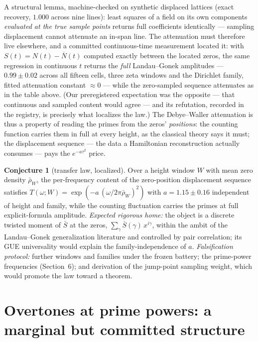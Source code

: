 \documentclass[11pt]{article}
\theoremstyle{definition}
\newtheorem{conjecture}{Conjecture}
\theoremstyle{remark}
\newcommand{\Nbar}{\overline{N}}
\begin{document}
A structural lemma, machine-checked on synthetic displaced lattices (exact recovery, $1.000$
across nine lines): least squares of a field on its own components \emph{evaluated at the true
sample points} returns full coefficients identically --- sampling displacement cannot attenuate an
in-span line. The attenuation must therefore live elsewhere, and a committed continuous-time
measurement located it: with $S(t) = N(t) - \Nbar(t)$ computed exactly between the located zeros,
the same regression in continuous $t$ returns the \emph{full} Landau--Gonek amplitudes ---
$0.99 \pm 0.02$ across all fifteen cells, three zeta windows and the Dirichlet family, fitted
attenuation constant $\approx 0$ --- while the zero-sampled sequence attenuates as in the table
above. (Our preregistered expectation was the opposite --- that continuous and sampled content
would agree --- and its refutation, recorded in the registry, is precisely what localizes the
law.) The Debye--Waller attenuation is thus a property of reading the primes from the zeros'
\emph{positions}: the counting function carries them in full at every height, as the classical
theory says it must; the displacement sequence --- the data a Hamiltonian reconstruction actually
consumes --- pays the $e^{-a\tau^2}$ price.

\begin{conjecture}[transfer law, localized]
Over a height window $W$ with mean zero density $\bar\rho_W$, the per-frequency content of the
zero-position displacement sequence satisfies
$T(\omega; W) = \exp(-a\,(\omega/2\pi\bar\rho_W)^2)$ with $a = 1.15 \pm 0.16$ independent of
height and family, while the counting fluctuation carries the primes at full explicit-formula
amplitude. \emph{Expected rigorous home:} the object is a discrete twisted moment of $\bar S$ at
the zeros, $\sum_{\gamma} \bar S(\gamma)\, x^{i\gamma}$, within the ambit of the Landau--Gonek
generalization literature and controlled by pair correlation; its GUE universality would explain
the family-independence of $a$. \emph{Falsification protocol:} further windows and families under
the frozen battery; the prime-power frequencies (Section~6); and derivation of the jump-point
sampling weight, which would promote the law toward a theorem.
\end{conjecture}

\section{Overtones at prime powers: a marginal but committed structure}
\end{document}
